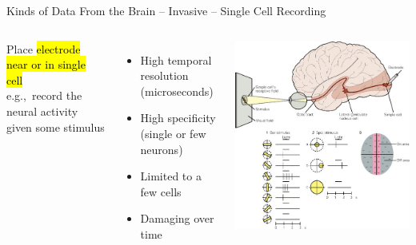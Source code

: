 \documentclass[handout,aspectratio=169]{beamer}
\begin{document}
\begin{frame}{Kinds of Data From the Brain -- Invasive -- Single Cell Recording}
	\vspace{0.5cm}
	\begin{columns}
		Place \hl{electrode near or in single cell}\\[0.125cm]
		e.g.,~record the neural activity given some stimulus\\[0.25cm]
		\begin{itemize}
			\setlength\itemsep{0.25cm}
			\item[\OPlus] High temporal resolution (microseconds)
			\item[\OPlus] High specificity (single or few neurons)
			\item[\OMinus] Limited to a few cells
			\item[\OMinus] Damaging over time
		\end{itemize}
		\includegraphics[width=\textwidth]{media/kandel_et_al_single_cell_recording.jpg}
	\end{columns}
	\vspace{0.5cm}
\end{frame}
\end{document}
